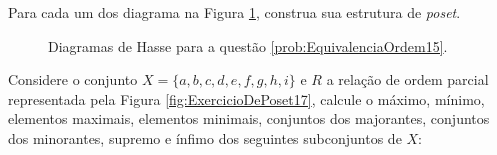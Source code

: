 \begin{problem}\label{prob:EquivalenciaOrdem16}
	Para cada um dos diagrama na Figura \ref{fig:DiagramaExercicioPoset1},   construa sua estrutura de \textit{poset}.
\end{problem}

\begin{figure}[h]
	\centering
	\quad\quad\quad %
	\caption{Diagramas de Hasse para a questão \ref{prob:EquivalenciaOrdem15}.}
	\label{fig:DiagramaExercicioPoset1}
\end{figure}


\begin{problem}\label{prob:EquivalenciaOrdem17}
	Considere o conjunto $X = \{a, b, c, d, e, f, g, h, i\}$ e $R$ a relação de ordem parcial representada pela Figura \ref{fig:ExercicioDePoset17}, calcule o máximo, mínimo, elementos maximais, elementos minimais, conjuntos dos majorantes, conjuntos dos minorantes, supremo e ínfimo dos seguintes subconjuntos  de $X$:
\end{problem}

